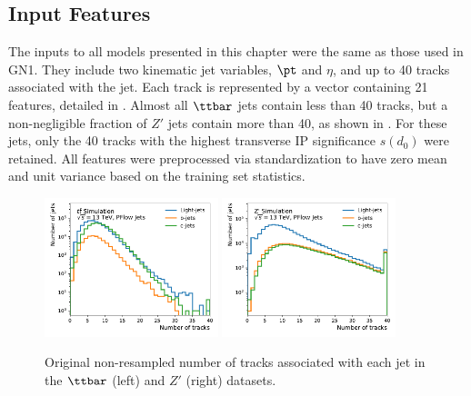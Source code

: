 \subsection{Input Features}

The inputs to all models presented in this chapter were the same as those used in GN1.
They include two kinematic jet variables, $\pt$ and $\eta$, and up to 40 tracks associated with the jet.
Each track is represented by a vector containing 21 features, detailed in .
Almost all $\ttbar$ jets contain less than 40 tracks, but a non-negligible fraction of $Z'$ jets contain more than 40, as shown in .
For these jets, only the 40 tracks with the highest transverse IP significance $s(d_0)$ were retained.
All features were preprocessed via standardization to have zero mean and unit variance based on the training set statistics.

\begin{figure}
    \centering
    \includegraphics[width=0.45\textwidth]{figures/flavour_tagging/ttbar_2.pdf}
    \includegraphics[width=0.45\textwidth]{figures/flavour_tagging/zprime_2.pdf}
    \caption{Original non-resampled number of tracks associated with each jet in the $\ttbar$ (left) and $Z'$ (right) datasets.}
    \label{fig:track_multiplicity}
\end{figure}

